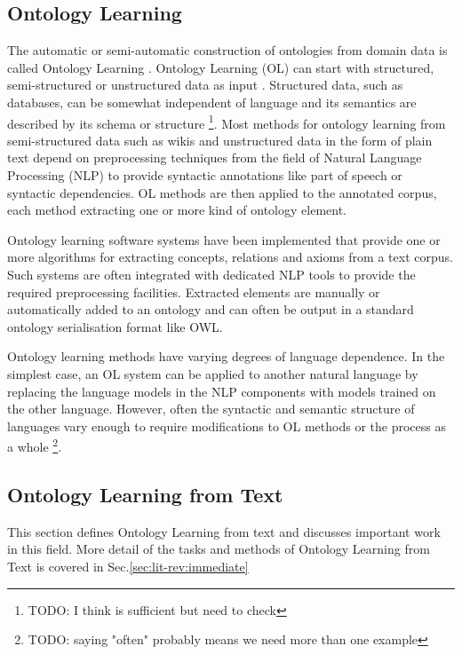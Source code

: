 \documentclass[a4paper]{report}
\newcommand{\todo}[1]{\footnote{{\color{red} TODO: #1}}}
\begin{document}
\subsection{Ontology Learning}
\label{sec:background:ontlearning}

The automatic or semi-automatic construction of ontologies from domain data is called Ontology Learning \cite{Cimiano06}.
Ontology Learning (OL) can start with structured, semi-structured or unstructured data as input \cite{Cimiano2009OL}.
Structured data, such as databases, can be somewhat independent of language and its semantics are described by its schema or structure \todo{I think \cite{Cimiano2009OL} is sufficient but need to check}.
Most methods for ontology learning from semi-structured data such as wikis and unstructured data in the form of plain text depend on preprocessing techniques from the field of Natural Language Processing (NLP) to provide syntactic annotations like part of speech or syntactic dependencies.
OL methods are then applied to the annotated corpus, each method extracting one or more kind of ontology element.

Ontology learning software systems have been implemented that provide one or more algorithms for extracting concepts, relations and axioms from a text corpus.
Such systems are often integrated with dedicated NLP tools to provide the required preprocessing facilities.
Extracted elements are manually or automatically added to an ontology and can often be output in a standard ontology serialisation format like OWL\cite{OWLOverview2004}.

Ontology learning methods have varying degrees of language dependence.
In the simplest case, an OL system can be applied to another natural language by replacing the language models in the NLP components with models trained on the other language.
However, often the syntactic and semantic structure of languages vary enough to require modifications to OL methods or the process as a whole \cite{Voelkner2008Spanish}\todo{saying "often" probably means we need more than one example}.

\subsection{Ontology Learning from Text}
\label{sec:background:ontlearning-text}

This section defines Ontology Learning from text and discusses important work in this field.
More detail of the tasks and methods of Ontology Learning from Text is covered in Sec.\ref{sec:lit-rev:immediate}
\end{document}
